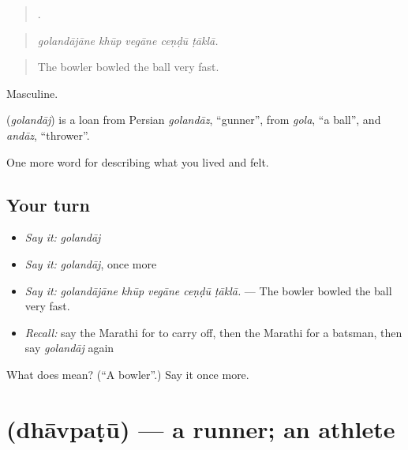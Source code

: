 \begin{quote}
    .
\end{quote}

\begin{quote}
\emph{golandājāne khūp vegāne ceṇḍū ṭāklā.}
\end{quote}

\begin{quote}
The bowler bowled the ball very fast.
\end{quote}

Masculine.

\begin{cousinweb}
\textbf{} (\emph{golandāj}) is a loan from Persian \emph{golandāz}, \textquotedblleft{}gunner\textquotedblright{}, from \emph{gola}, \textquotedblleft{}a ball\textquotedblright{}, and \emph{andāz}, \textquotedblleft{}thrower\textquotedblright{}.
\end{cousinweb}

\begin{grammarlens}[title={What you've built}]
One more word for describing what you lived and felt.
\end{grammarlens}

\subsection*{Your turn}
\begin{itemize}
\raggedright
  \item \emph{Say it:} \emph{golandāj}
  \item \emph{Say it:} \emph{golandāj}, once more
  \item \emph{Say it:} \emph{golandājāne khūp vegāne ceṇḍū ṭāklā.} — The bowler bowled the ball very fast.
  \item \emph{Recall:} say the Marathi for to carry off, then the Marathi for a batsman, then say \emph{golandāj} again
\end{itemize}

\begin{tcolorbox}[breakable,colback=teal!4,colframe=teal!35!black,title={Before you move on}]
What does  mean? (\textquotedblleft{}A bowler\textquotedblright{}.) Say it once more.
\end{tcolorbox}
\section[\texorpdfstring{\mr{धावपटू} (dhāvpaṭū)}{धावपटू (dhāvpaṭū)}]{ (dhāvpaṭū) — a runner; an athlete}


